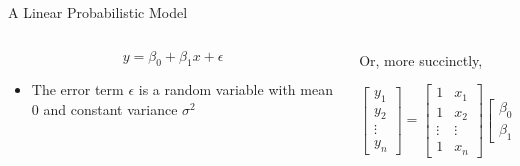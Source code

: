 \documentclass[australian,ignorenonframetext,aspectratio=169]{beamer}
\providecommand{\tightlist}{%
  \setlength{\itemsep}{0pt}\setlength{\parskip}{0pt}}
\begin{document}
\begin{frame}{A Linear Probabilistic Model}
\protect\hypertarget{a-linear-probabilistic-model}{}

\begin{columns}[T]
\begin{column}{0.5\textwidth}
\tiny


\[y = \beta_0 + \beta_1x + \epsilon\]

\begin{itemize}
\tightlist
\item
  The error term \(\epsilon\) is a random variable with mean 0 and
  constant variance \(\sigma^2\)
\end{itemize}
\end{column}

\begin{column}{0.5\textwidth}
Or, more succinctly,

\[\left[\begin{array}{c}
y_1 \\
y_2 \\
\vdots \\
y_n
\end{array}\right]=\left[\begin{array}{cc}
1 & x_1 \\
1 & x_2 \\
\vdots & \vdots \\
1 & x_n
\end{array}\right]\left[\begin{array}{c}
\beta_0 \\
\beta_1
\end{array}\right]+\left[\begin{array}{c}
\varepsilon_1 \\
\varepsilon_2 \\
\vdots \\
\varepsilon_n
\end{array}\right]\]
\end{column}
\end{columns}

\end{frame}
\end{document}
